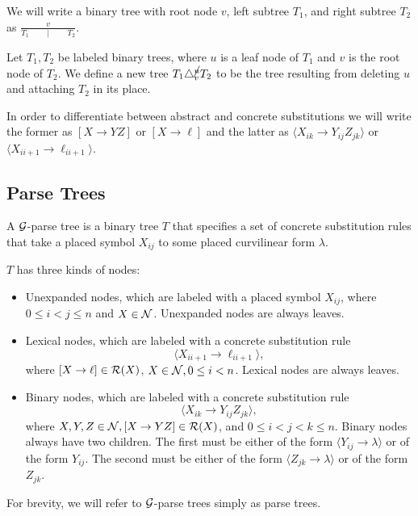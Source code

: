 We will write a binary tree with root node $v$, left subtree $T_1$,
and right subtree $T_2$ as $\frac{v}{T_1\qquad \mid \qquad T_2}.$

\begin{defn}
  Let $T_1, T_2$ be labeled binary trees, where $u$ is a leaf node of
  $T_1$ and $v$ is the root node of $T_2$. We define a new tree $T_1
  \triangle^{\cancel{u}}_v T_2$ to be the tree resulting from deleting
  $u$ and attaching $T_2$ in its place.
\end{defn}

In order to differentiate between abstract and concrete substitutions
we will write the former as $[X\to YZ]$ or $[X\to \ell]$ and the
latter as $\langle X_{ik} \to Y_{ij} Z_{jk} \rangle$ or $\langle X_{i
  i+1} \to \ell_{i i+1} \rangle$.

\subsection{Parse Trees}

\begin{defn}
  A ${\mathcal G}$-parse tree is a binary tree $T$ that specifies a set
  of concrete substitution rules that take a placed symbol $X_{ij}$
  to some placed curvilinear form $\lambda$.

  $T$ has three kinds of nodes:
  \begin{itemize}
  \item Unexpanded nodes, which are labeled with a placed symbol
    $X_{ij}$, where $0\le i < j \le n$ and $X\in {\mathcal N}$. Unexpanded
    nodes are always leaves.
  \item Lexical nodes, which are labeled with a concrete substitution
    rule $$\langle X_{i i+1} \to \ell_{i i+1}\rangle,$$ where $[X\to \ell]\in
    {\mathcal R}(X)$, $X\in {\mathcal N}, 0\le i < n$. Lexical nodes are always leaves.
  \item Binary nodes, which are labeled with a concrete substitution
    rule $$\langle X_{ik}\to Y_{ij} Z_{jk}\rangle,$$ where $X,Y,Z\in
    {\mathcal N}, [X\to YZ]\in {\mathcal R}(X)$, and $0 \le i < j < k \le n$. Binary
    nodes always have two children. The first must be either of the
    form $\langle Y_{ij} \to \lambda \rangle$ or of the form $Y_{ij}$.
    The second must be either of the form $\langle Z_{jk} \to \lambda
    \rangle$ or of the form $Z_{jk}$.
  \end{itemize}
\end{defn}
For brevity, we will refer to ${\mathcal G}$-parse trees simply as parse
trees.

